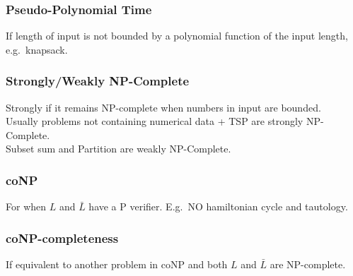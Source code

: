 \subsubsection{Pseudo-Polynomial Time}
If length of input is not bounded by a polynomial function of the input length, e.g.\ knapsack.

\subsubsection{Strongly/Weakly NP-Complete}
Strongly if it remains NP-complete when numbers in input are bounded.\\
Usually problems not containing numerical data + TSP are strongly NP-Complete.\\
Subset sum and Partition are weakly NP-Complete.

\subsubsection{coNP}
For when $L$ and $\bar{L}$ have a P verifier. E.g.\ NO hamiltonian cycle and tautology.

\subsubsection{coNP-completeness}
If equivalent to another problem in coNP and both $L$ and $\bar{L}$ are NP-complete.
